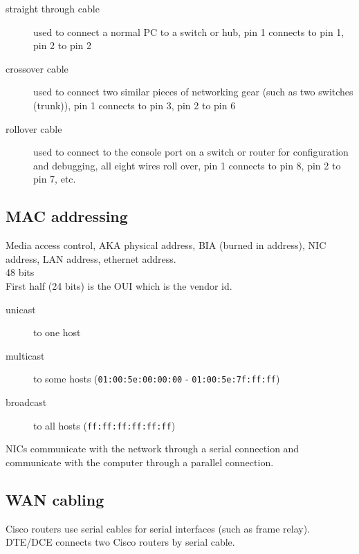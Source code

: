 \begin{description}

\item[straight through cable]
used to connect a normal PC to a switch or hub, pin 1 connects to pin 1, pin 2
to pin 2

\item[crossover cable]
used to connect two similar pieces of networking gear (such as two switches
(trunk)), pin 1 connects to pin 3, pin 2 to pin 6

\item[rollover cable]
used to connect to the console port on a switch or router for configuration and
debugging, all eight wires roll over, pin 1 connects to pin 8, pin 2 to pin 7,
etc.

\end{description}

\subsection{MAC addressing}

Media access control, AKA physical address, BIA (burned in address), NIC
address, LAN address, ethernet address.\\

48 bits\\

First half (24 bits) is the OUI which is the vendor id.

\begin {description}

\item[unicast]
to one host

\item[multicast]
to some hosts (\texttt{01:00:5e:00:00:00} - \texttt{01:00:5e:7f:ff:ff})

\item[broadcast]
to all hosts (\texttt{ff:ff:ff:ff:ff:ff})

\end{description}

NICs communicate with the network through a serial connection and communicate
with the computer through a parallel connection.

\subsection{WAN cabling}

Cisco routers use serial cables for serial interfaces (such as frame relay).\\

DTE/DCE connects two Cisco routers by serial cable.

